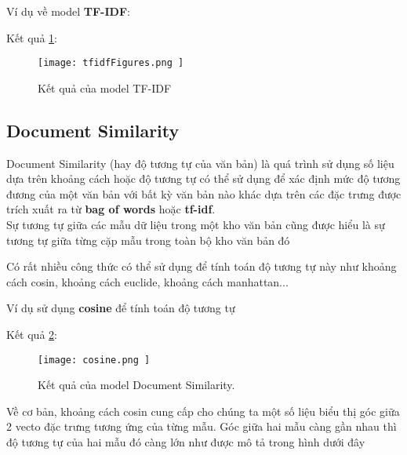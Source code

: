 Ví dụ về model \textbf{TF-IDF}: 



Kết quả \ref{pic2.4}:

\begin{figure}[h!]
	\centering
	\texttt{[image: 
		tfidfFigures.png
	]}
	\caption[Kết quả của model TF-IDF]{
		Kết quả của model TF-IDF   \cite{WEBSITE:11} \label{pic2.4}
	}
\end{figure}

\subsection{Document Similarity}
Document Similarity (hay độ tương tự của văn bản) là quá trình sử dụng số liệu dựa trên khoảng cách hoặc độ tương tự có thể sử dụng để xác định mức độ tương đương của một văn bản với bất kỳ văn bản nào khác dựa trên các đặc trưng được trích xuất ra từ \textbf{bag of words} hoặc \textbf{tf-idf}.\\
Sự tương tự giữa các mẫu dữ liệu trong một kho văn bản cũng được hiểu là sự tương tự giữa từng cặp mẫu trong toàn bộ kho văn bản đó

Có rất nhiều công thức có thể sử dụng để tính toán độ tương tự này như khoảng cách cosin, khoảng cách euclide, khoảng cách manhattan...  \cite{WEBSITE:11}

Ví dụ sử dụng \textbf{cosine} để tính toán độ tương tự 


Kết quả \ref{pic2.5}:
\begin{figure}[h!]
	\centering
	\texttt{[image: 
		cosine.png
	]}
	\caption[Kết quả của model  Document Similarity.]{
		Kết quả của model  Document Similarity.   \cite{WEBSITE:11} \label{pic2.5}
	}
\end{figure}

Về cơ bản, khoảng cách cosin cung cấp cho chúng ta một số liệu biểu thị góc giữa 2 vecto đặc trưng tương ứng của từng mẫu. Góc giữa hai mẫu càng gần nhau thì độ tương tự của hai mẫu đó càng lớn như được mô tả trong hình dưới đây\\


